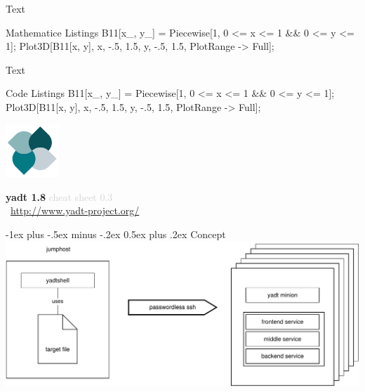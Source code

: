 \documentclass[10pt,landscape]{article}
\makeatletter
\renewcommand{\section}{\@startsection{section}{1}{0mm}%
                                {-1ex plus -.5ex minus -.2ex}%
                                {0.5ex plus .2ex}%
                                {\normalfont\large\bfseries}}
\makeatother
\begin{document}
Text

\begin{code}{Mathematice Listings}
B11[x_, y_] = Piecewise[{{1, 0 <= x <= 1 && 0 <= y <= 1}}];
Plot3D[B11[x, y], {x, -.5, 1.5}, {y, -.5, 1.5}, PlotRange -> Full]; 
\end{code}

Text

\begin{code}{Code Listings}
B11[x_, y_] = Piecewise[{{1, 0 <= x <= 1 && 0 <= y <= 1}}];
Plot3D[B11[x, y], {x, -.5, 1.5}, {y, -.5, 1.5}, PlotRange -> Full]; 
\end{code}

\newpage

\raggedright
\footnotesize
\begin{multicols}{3}


\setlength{\premulticols}{1pt}
\setlength{\postmulticols}{1pt}
\setlength{\multicolsep}{1em}
\setlength{\columnsep}{1em}

\includegraphics[width=2cm,valign=t]{res/yadtlogo}%
\hfill%
\begin{minipage}[t]{5cm}
{\Large{\textbf{yadt 1.8}}}\hfill
\textcolor{lightgrey}{cheat sheet 0.3}\\[1em]
~\hfill\href{http://www.yadt-project.org/}{http://www.yadt-project.org/}
\end{minipage}


\section{Concept}
\includegraphics[width=\linewidth]{res/concept}


\end{multicols}
\end{document}
